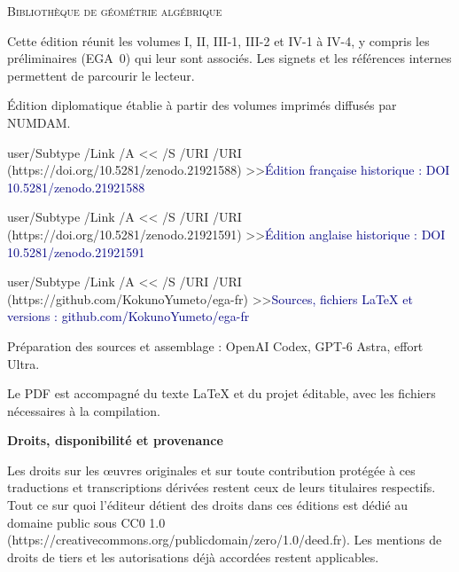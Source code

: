 \documentclass[11pt,a4paper]{article}
\newcommand{\editionlink}[2]{\leavevmode\pdfstartlink user{/Subtype /Link /A << /S /URI /URI (#1) >>}\textcolor{navy}{#2}\pdfendlink}
\begin{document}
\color{navy}
\noindent\textsc{Bibliothèque de géométrie algébrique}\par
\vspace{22mm}
\par
\vspace{9mm}
\par
\vspace{18mm}
\par
\vspace{3mm}
\par
\vspace{10mm}
\color{muted}
\noindent Cette édition réunit les volumes I, II, III-1, III-2 et IV-1 à IV-4,
y compris les préliminaires (EGA~0) qui leur sont associés.
Les signets et les références internes permettent de parcourir le lecteur.\par
\vspace{5mm}
\noindent Édition diplomatique établie à partir des volumes imprimés
diffusés par NUMDAM.\par
\vspace{9mm}
\noindent\editionlink{https://doi.org/10.5281/zenodo.21921588}{Édition française historique : DOI 10.5281/zenodo.21921588}\par
\vspace{3mm}
\noindent\editionlink{https://doi.org/10.5281/zenodo.21921591}{Édition anglaise historique : DOI 10.5281/zenodo.21921591}\par
\vspace{3mm}
\noindent\editionlink{https://github.com/KokunoYumeto/ega-fr}{Sources, fichiers LaTeX et versions : github.com/KokunoYumeto/ega-fr}\par
\vfill
\small
\noindent Préparation des sources et assemblage : OpenAI Codex,
GPT-6 Astra, effort Ultra.\par
\vspace{3mm}
\noindent Le PDF est accompagné du texte LaTeX et du projet éditable,
avec les fichiers nécessaires à la compilation.\par

\clearpage
\begingroup
\small
\noindent\textbf{Droits, disponibilité et provenance}

Les droits sur les œuvres originales et sur toute contribution protégée à ces traductions et transcriptions dérivées restent ceux de leurs titulaires respectifs. Tout ce sur quoi l'éditeur détient des droits dans ces éditions est dédié au domaine public sous CC0 1.0 (https://creativecommons.org/publicdomain/zero/1.0/deed.fr). Les mentions de droits de tiers et les autorisations déjà accordées restent applicables.
\end{document}
